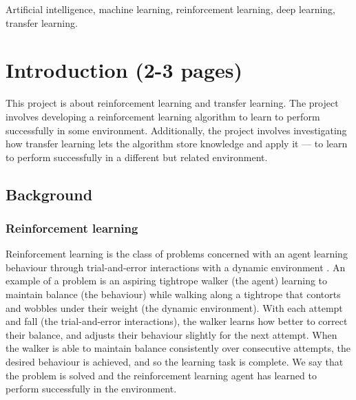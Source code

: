 \documentclass[12pt,a4paper]{article}
\begin{document}
\begin{keywords}
Artificial intelligence, machine learning, reinforcement learning, deep learning, transfer learning.
\end{keywords}

\newpage
\section{Introduction (2-3 pages)}
This project is about reinforcement learning and transfer learning. The project involves developing a reinforcement learning algorithm to learn to perform successfully in some environment. Additionally, the project involves investigating how transfer learning lets the algorithm store knowledge and apply it --- to learn to perform successfully in a different but related environment.

\subsection{Background} 
\subsubsection{Reinforcement learning}
Reinforcement learning is the class of problems concerned with an agent learning behaviour through trial-and-error interactions with a dynamic environment \cite{Kaelbling1996}. An example of a problem is an aspiring tightrope walker (the agent) learning to maintain balance (the behaviour) while walking along a tightrope that contorts and wobbles under their weight (the dynamic environment). With each attempt and fall (the trial-and-error interactions), the walker learns how better to correct their balance, and adjusts their behaviour slightly for the next attempt. When the walker is able to maintain balance consistently over consecutive attempts, the desired behaviour is achieved, and so the learning task is complete. We say that the problem is solved and the reinforcement learning agent has learned to perform successfully in the environment.  
\end{document}
